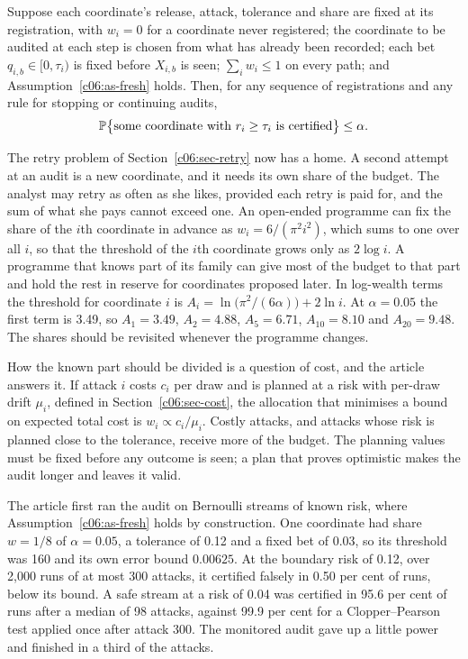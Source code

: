 \begin{proposition}\label{c06:prop-gate}
Suppose each coordinate's release, attack, tolerance and share are fixed at its
registration, with $w_i = 0$ for a coordinate never registered; the coordinate to
be audited at each step is chosen from what has already been recorded; each bet
$q_{i,b} \in [0, \tau_i)$ is fixed before $X_{i,b}$ is seen; $\sum_i w_i \le 1$ on
every path; and Assumption~\ref{c06:as-fresh} holds. Then, for any sequence of
registrations and any rule for stopping or continuing audits,
\begin{equation}\label{c06:eq-family}
\mathbb{P}\big\{\text{some coordinate with } r_i \ge \tau_i \text{ is certified}\big\}
\le \alpha .
\end{equation}
\end{proposition}

The retry problem of Section~\ref{c06:sec-retry} now has a home. A second attempt
at an audit is a new coordinate, and it needs its own share of the budget. The
analyst may retry as often as she likes, provided each retry is paid for, and the
sum of what she pays cannot exceed one. An open-ended programme can fix the share
of the $i$th coordinate in advance as $w_i = 6/(\pi^2 i^2)$, which sums to one over
all $i$, so that the threshold of the $i$th coordinate grows only as $2 \log i$.
A programme that knows part of its family can give most of the budget to that part
and hold the rest in reserve for coordinates proposed later.
In log-wealth terms the threshold for coordinate $i$ is
$A_i = \ln\bigl(\pi^2/(6\alpha)\bigr) + 2\ln i$. At $\alpha = 0.05$ the first term is
3.49, so $A_1 = 3.49$, $A_2 = 4.88$, $A_5 = 6.71$, $A_{10} = 8.10$ and $A_{20} = 9.48$.
The shares should be revisited whenever the programme changes.

How the known part should be divided is a question of cost, and the article
answers it. If attack $i$ costs $c_i$ per draw and is planned at a risk with
per-draw drift $\mu_i$, defined in Section~\ref{c06:sec-cost}, the allocation that
minimises a bound on expected total cost is $w_i \propto c_i/\mu_i$. Costly attacks,
and attacks whose risk is planned close to the tolerance, receive more of the
budget. The planning values must be fixed before any outcome is seen; a plan that
proves optimistic makes the audit longer and leaves it valid.

The article first ran the audit on Bernoulli streams of known risk, where
Assumption~\ref{c06:as-fresh} holds by construction. One coordinate had share
$w = 1/8$ of $\alpha = 0.05$, a tolerance of 0.12 and a fixed bet of 0.03, so its
threshold was 160 and its own error bound $0.00625$. At the boundary risk of 0.12,
over 2,000 runs of at most 300 attacks, it certified falsely in 0.50 per cent of
runs, below its bound. A safe stream at a risk of 0.04 was certified in 95.6 per cent
of runs after a median of 98 attacks, against 99.9 per cent for a Clopper--Pearson
test applied once after attack 300.
The monitored audit gave up a little power and finished in a third of the attacks.

